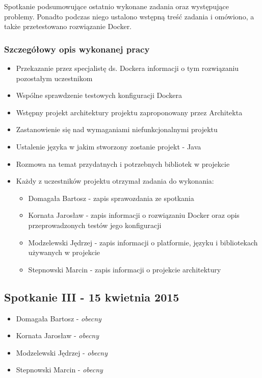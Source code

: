 \par{Spotkanie podsumowujące ostatnio wykonane zadania oraz występujące problemy. Ponadto podczas niego ustalono wstępną treść zadania i omówiono, a także przetestowano rozwiązanie Docker.}


\subsubsection*[Szczegółowy opis wykonanej pracy]{Szczegółowy opis wykonanej pracy}

\begin{itemize}
\item Przekazanie przez specjalistę ds. Dockera informacji o tym rozwiązaniu pozostałym uczestnikom
\item Wspólne sprawdzenie testowych konfiguracji Dockera
\item Wstępny projekt architektury projektu zaproponowany przez Architekta
\item Zastanowienie się nad wymaganiami niefunkcjonalnymi projektu
\item Ustalenie języka w jakim stworzony zostanie projekt - Java
\item Rozmowa na temat przydatnych i potrzebnych bibliotek w projekcie

\item Każdy z uczestników projektu otrzymał zadania do wykonania:
\begin{itemize}
\item Domagała Bartosz - zapis sprawozdania ze spotkania
\item Kornata Jarosław - zapis informacji o rozwiązaniu Docker oraz opis przeprowadzonych testów jego konfiguracji
\item Modzelewski Jędrzej - zapis informacji o platformie, języku i bibliotekach używanych w projekcie
\item Stepnowski Marcin - zapis informacji o projekcie architektury
\end{itemize}
\end{itemize}


\subsection[Spotkanie III - 15 kwietnia 2015]{Spotkanie III - 15 kwietnia 2015}

\begin{itemize}
\item Domagała Bartosz - \textit{obecny}
\item Kornata Jarosław - \textit{obecny}
\item Modzelewski Jędrzej - \textit{obecny}
\item Stepnowski Marcin - \textit{obecny}
\end{itemize}

